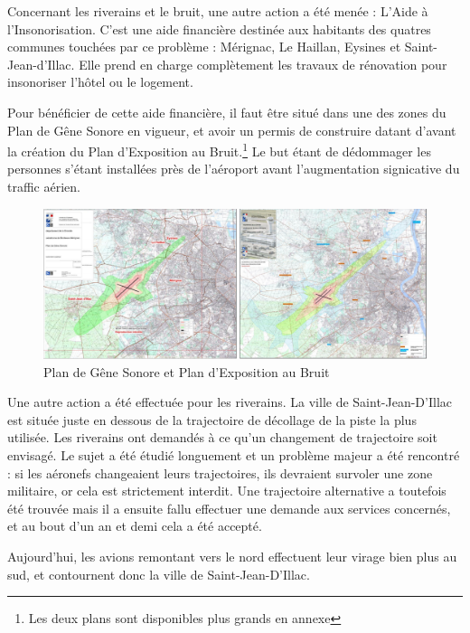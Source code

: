 Concernant les riverains et le bruit, une autre action a été menée : L'Aide à l'Insonorisation.
C'est une aide financière destinée aux habitants des quatres communes touchées par ce problème : Mérignac, Le Haillan, Eysines et Saint-Jean-d'Illac. Elle prend en charge complètement les travaux de rénovation pour insonoriser l'hôtel ou le logement.

Pour bénéficier de cette aide financière, il faut être situé dans une des zones du Plan de Gêne Sonore en vigueur, et avoir un permis de construire datant d'avant la création du Plan d'Exposition au Bruit.\footnote{Les deux plans sont disponibles plus grands en annexe}
Le but étant de dédommager les personnes s'étant installées près de l'aéroport avant l'augmentation signicative du traffic aérien.

\begin{figure}[hbt!]
  \centering
  \includegraphics[width=17cm]{Images/pgs_peb.png}\newline
  \caption{Plan de Gêne Sonore et Plan d'Exposition au Bruit}
  \label{fig:pgs_peb}
\end{figure}


Une autre action a été effectuée pour les riverains. La ville de Saint-Jean-D'Illac est située juste en dessous de la trajectoire de décollage de la piste la plus utilisée. Les riverains ont demandés à ce qu'un changement de trajectoire soit envisagé.
Le sujet a été étudié longuement et un problème majeur a été rencontré : si les aéronefs changeaient leurs trajectoires, ils devraient survoler une zone militaire, or cela est strictement interdit.
Une trajectoire alternative a toutefois été trouvée mais il a ensuite fallu effectuer une demande aux services concernés, et au bout d'un an et demi cela a été accepté.\newline

Aujourd'hui, les avions remontant vers le nord effectuent leur virage bien plus au sud, et contournent donc la ville de Saint-Jean-D'Illac.\newline

